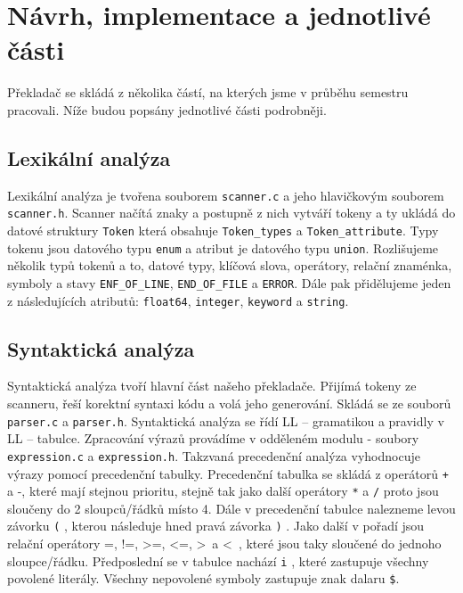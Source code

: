 \documentclass[a4paper, 11pt]{article}
\begin{document}
	
	\section{Návrh, implementace a jednotlivé části}

	Překladač se skládá z několika částí, na kterých jsme v průběhu semestru pracovali. Níže budou popsány jednotlivé části podrobněji.
	
	\subsection{Lexikální analýza}
	
	Lexikální analýza je tvořena souborem \texttt{scanner.c} a jeho hlavičkovým souborem \texttt{scanner.h}. Scanner načítá znaky a postupně z nich vytváří tokeny a ty ukládá do datové struktury \texttt{Token} která obsahuje \texttt{Token\_types} a \texttt{Token\_attribute}. Typy tokenu jsou datového typu \texttt{enum} a atribut je datového typu \texttt{union}. Rozlišujeme několik typů tokenů a to, datové typy, klíčová slova, operátory, relační znaménka, symboly a stavy \texttt{ENF\_OF\_LINE}, \texttt{END\_OF\_FILE} a \texttt{ERROR}. Dále pak přidělujeme jeden z následujících atributů: \texttt{float64}, \texttt{integer}, \texttt{keyword} a \texttt{string}.
    
    \subsection{Syntaktická analýza}
    
    Syntaktická analýza tvoří hlavní část našeho překladače. Přijímá tokeny ze scanneru, řeší korektní syntaxi kódu a volá jeho generování. Skládá se ze souborů \texttt{parser.c} a \texttt{parser.h}. Syntaktická analýza se řídí LL -- gramatikou a pravidly v LL -- tabulce. Zpracování výrazů provádíme v odděleném modulu - soubory \texttt{expression.c} a \texttt{expression.h}. Takzvaná precedenční analýza vyhodnocuje výrazy pomocí precedenční tabulky. Precedenční tabulka se skládá z operátorů \texttt{+} a -, které mají stejnou prioritu, stejně tak jako další operátory \texttt{*} a \texttt{/} proto jsou sloučeny do 2 sloupců/řádků místo 4. Dále v precedenční tabulce nalezneme levou závorku \texttt{(} , kterou následuje hned pravá závorka \texttt{)} . Jako další v pořadí jsou relační operátory =, !=, \textgreater=, \textless=, \textgreater\ a \textless\ , které jsou taky sloučené do jednoho sloupce/řádku. Předposlední se v tabulce nachází \texttt{i} , které zastupuje všechny povolené literály. Všechny nepovolené symboly zastupuje znak dalaru \texttt{\$}.
    
\end{document}
